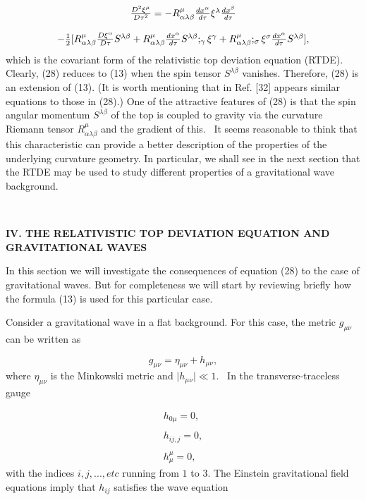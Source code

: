 \documentclass[a4paper,12pt]{article}
\begin{document}
\begin{equation}
\begin{array}{c}
\frac{D^{2}\xi ^{\mu }}{D\tau ^{2}}=-R_{\alpha \lambda \beta }^{\mu }\frac{%
dx^{\alpha }}{d\tau }\xi ^{\lambda }\frac{dx^{\beta }}{d\tau } \\ 
\\ 
-\frac{1}{2}[R_{\alpha \lambda \beta }^{\mu }\frac{D\xi ^{\alpha }}{D\tau }%
S^{\lambda \beta }+R_{\alpha \lambda \beta }^{\mu }\frac{dx^{\alpha }}{d\tau 
}S^{\lambda \beta };_{\gamma }\xi ^{\gamma }+R_{\alpha \lambda \beta }^{\mu
};_{\sigma }\xi ^{\sigma }\frac{dx^{\alpha }}{d\tau }S^{\lambda \beta }],
\end{array}
\label{28}
\end{equation}
which is the covariant form of the relativistic top deviation equation
(RTDE). Clearly, (28) reduces to (13) when the spin tensor $S^{\lambda \beta
}$ vanishes. Therefore, (28) is an extension of (13). (It is worth
mentioning that in Ref. [32] appears similar equations to those in (28).)
One of the attractive features of (28) is that the spin angular momentum $%
S^{\lambda \beta }$ of the top is coupled to gravity via the curvature
Riemann tensor $R_{\alpha \lambda \beta }^{\mu }$ and the gradient of this.
\ It seems reasonable to think that this characteristic can provide a better
description of the properties of the underlying curvature geometry. In
particular, we shall see in the next section that the RTDE may be used to
study different properties of a gravitational wave background.

\bigskip \smallskip \bigskip\ 

\noindent \textbf{IV. THE RELATIVISTIC TOP DEVIATION EQUATION AND
GRAVITATIONAL WAVES}

\bigskip

In this section we will investigate the consequences of equation (28) to the
case of gravitational waves. But for completeness we will start by reviewing
briefly how the formula (13) is used for this particular case.

Consider a gravitational wave in a flat background. For this case, the
metric $g_{\mu \nu }$ can be written as

\begin{equation}
g_{\mu \nu }=\eta _{\mu \nu }+h_{\mu \nu },  \label{29}
\end{equation}
where $\eta _{\mu \nu }$ is the Minkowski metric and $\mid h_{\mu \nu }\mid
\ll 1.$ \ In the transverse-traceless gauge

\begin{equation}
\begin{array}{c}
h_{0\mu }=0, \\ 
\\ 
h_{ij,j}=0, \\ 
\\ 
h_{\mu }^{\mu }=0,
\end{array}
\label{30}
\end{equation}
with the indices $i,j,...,etc$ running from $1$ to $3$. The Einstein
gravitational field equations imply that $h_{ij}$ satisfies the wave equation
\end{document}

